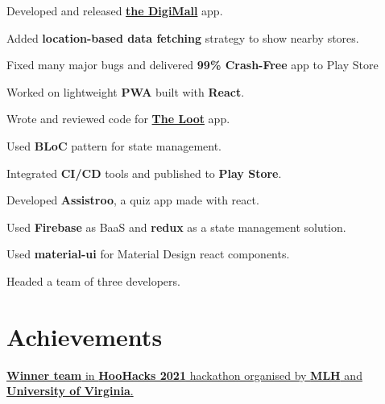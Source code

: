 \documentclass[]{deedy-resume-openfont}
\begin{document}
\begin{minipage}[t]{0.67\textwidth}
\begin{tightemize}
\item Developed and released \href{https://play.google.com/store/apps/details?id=com.business.prachar}{\textbf{the DigiMall}} app.
\item Added \textbf{location-based data fetching} strategy to show nearby stores. 
\item Fixed many major bugs and delivered \textbf{99\% Crash-Free} app to Play Store
\item Worked on lightweight \textbf{PWA} built with \textbf{React}.
\end{tightemize}
\sectionsep

\begin{tightemize}
\item Wrote and reviewed code for \href{https://play.google.com/store/apps/details?id=com.arette.students}{\textbf{The Loot}} app.
\item Used \textbf{BLoC} pattern for state management. 
\item Integrated \textbf{CI/CD} tools and published to \textbf{Play Store}.
\end{tightemize}
\sectionsep

\begin{tightemize}
\item Developed \textbf{Assistroo}, a quiz app made with react.
\item Used \textbf{Firebase} as BaaS and \textbf{redux} as a state management solution. 
\item Used \textbf{material-ui} for Material Design react components.
\item Headed a team of three developers.
\end{tightemize}
\sectionsep
\section{Achievements} 
\href{https://devpost.com/software/finlearn}{{\textbf{Winner team}} in \textbf{HooHacks 2021} hackathon organised by \textbf{MLH} and \textbf{University of Virginia}.}

\end{minipage} 
\end{document}
